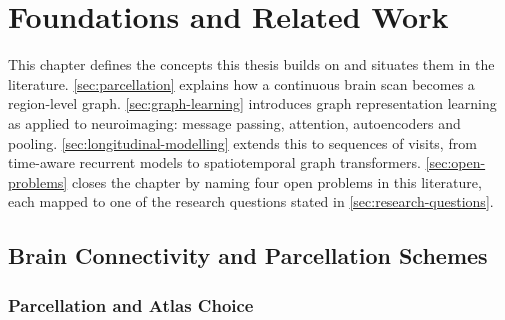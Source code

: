 
\chapter{Foundations and Related Work}\label{ch:foundations}

This chapter defines the concepts this thesis builds on and situates them in the
literature. \autoref{sec:parcellation} explains how a continuous brain scan becomes a
region-level graph. \autoref{sec:graph-learning} introduces graph representation learning
as applied to neuroimaging: message passing, attention, autoencoders and pooling.
\autoref{sec:longitudinal-modelling} extends this to sequences of visits, from
time-aware recurrent models to spatiotemporal graph transformers. \autoref{sec:open-problems}
closes the chapter by naming four open problems in this literature, each mapped to one of
the research questions stated in \autoref{sec:research-questions}.

\section{Brain Connectivity and Parcellation Schemes}\label{sec:parcellation}

\subsection{Parcellation and Atlas Choice}\label{sec:parcellation-atlas}

